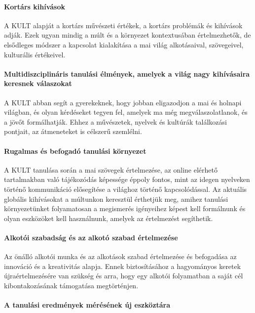 \paragraph{Kortárs kihívások}

A KULT alapját a kortárs művészeti értékek, a kortárs problémák és kihívások adják. Ezek ugyan mindig a múlt és a környezet kontextusában értelmezhetők, de elsődleges módszer a kapcsolat kialakítása a mai világ alkotásaival, szövegeivel, kulturális értékeivel.

\paragraph{Multidiszciplináris tanulási élmények, amelyek a világ nagy kihívásaira keresnek válaszokat}

A KULT abban segít a gyerekeknek, hogy jobban eligazodjon a mai és holnapi világban, és olyan kérdéseket tegyen fel, amelyek ma még megválaszolatlanok, és a jövőt formálhatják. Ehhez a művészetek, nyelvek és kultúrák találkozási pontjait, az átmeneteket is célszerű szemlélni.

\paragraph{Rugalmas és befogadó tanulási környezet}

A KULT tanulása során a mai szövegek értelmezése, az online elérhető tartalmakban való tájékozódás képessége éppoly fontos, mint az idegen nyelveken történő kommunikáció elősegítése a világhoz történő kapcsolódással. Az aktuális globális kihívásokat a múltunkon keresztül érthetjük meg, amihez tanulási környezetünket folyamatosan a megismerés igényeihez képest kell formálnunk és olyan eszközöket kell használnunk, amelyek az értelmezést segíthetik.

\paragraph{Alkotói szabadság és az alkotó szabad értelmezése}

Az önálló alkotói munka és az alkotások szabad értelmezése és befogadása az innováció és a kreativitás alapja. Ennek biztosításához a hagyományos keretek újraértelmezésére van szükség és arra, hogy egy alkotói folyamatban a saját cél kibontakozásának támogatása megtörténjen.

\paragraph{A tanulási eredmények mérésének új eszköztára}

